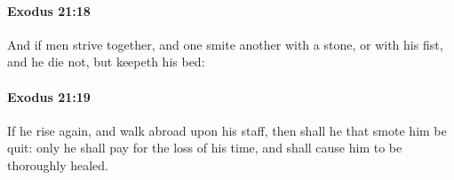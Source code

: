 		\paragraph{Exodus 21:18} %
			\label{EXODUS-21-18}

			And if men strive together, and one smite another with a stone, or with his fist, and he die not, but keepeth his bed:


		\paragraph{Exodus 21:19} %
			\label{EXODUS-21-19}

			If he rise again, and walk abroad upon his staff, then shall he that smote him be quit: only he shall pay for the loss of his time, and shall cause him to be thoroughly healed.


